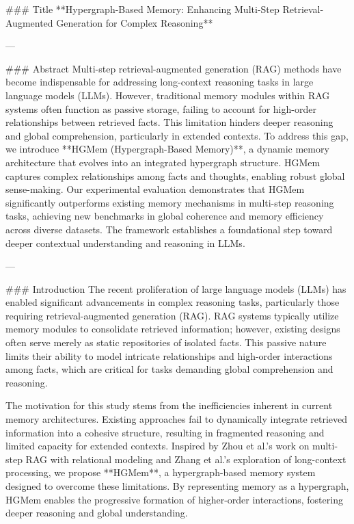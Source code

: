 ### Title  
**Hypergraph-Based Memory: Enhancing Multi-Step Retrieval-Augmented Generation for Complex Reasoning**

---

### Abstract  
Multi-step retrieval-augmented generation (RAG) methods have become indispensable for addressing long-context reasoning tasks in large language models (LLMs). However, traditional memory modules within RAG systems often function as passive storage, failing to account for high-order relationships between retrieved facts. This limitation hinders deeper reasoning and global comprehension, particularly in extended contexts. To address this gap, we introduce **HGMem (Hypergraph-Based Memory)**, a dynamic memory architecture that evolves into an integrated hypergraph structure. HGMem captures complex relationships among facts and thoughts, enabling robust global sense-making. Our experimental evaluation demonstrates that HGMem significantly outperforms existing memory mechanisms in multi-step reasoning tasks, achieving new benchmarks in global coherence and memory efficiency across diverse datasets. The framework establishes a foundational step toward deeper contextual understanding and reasoning in LLMs.

---

### Introduction  
The recent proliferation of large language models (LLMs) has enabled significant advancements in complex reasoning tasks, particularly those requiring retrieval-augmented generation (RAG). RAG systems typically utilize memory modules to consolidate retrieved information; however, existing designs often serve merely as static repositories of isolated facts. This passive nature limits their ability to model intricate relationships and high-order interactions among facts, which are critical for tasks demanding global comprehension and reasoning.

The motivation for this study stems from the inefficiencies inherent in current memory architectures. Existing approaches fail to dynamically integrate retrieved information into a cohesive structure, resulting in fragmented reasoning and limited capacity for extended contexts. Inspired by Zhou et al.'s work on multi-step RAG with relational modeling and Zhang et al.'s exploration of long-context processing, we propose **HGMem**, a hypergraph-based memory system designed to overcome these limitations. By representing memory as a hypergraph, HGMem enables the progressive formation of higher-order interactions, fostering deeper reasoning and global understanding.

